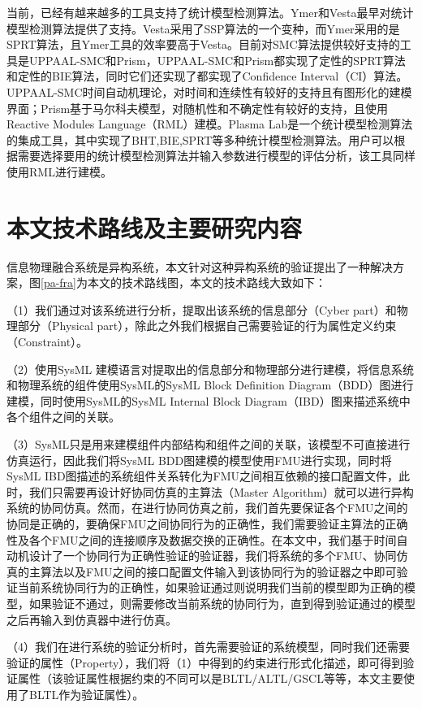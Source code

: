 当前，已经有越来越多的工具支持了统计模型检测算法。Ymer\cite{younes2005ymer}和Vesta\cite{sen2005vesta}最早对统计模型检测算法提供了支持。Vesta采用了SSP算法的一个变种，而Ymer采用的是SPRT算法，且Ymer工具的效率要高于Vesta。目前对SMC算法提供较好支持的工具是UPPAAL-SMC和Prism，UPPAAL-SMC和Prism都实现了定性的SPRT算法和定性的BIE算法，同时它们还实现了都实现了Confidence Interval（CI）\cite{brown2001interval}算法。UPPAAL-SMC时间自动机理论，对时间和连续性有较好的支持且有图形化的建模界面；Prism基于马尔科夫模型，对随机性和不确定性有较好的支持，且使用Reactive Modules Language（RML）建模。Plasma Lab\cite{boyer2013plasma}是一个统计模型检测算法的集成工具，其中实现了BHT,BIE,SPRT等多种统计模型检测算法。用户可以根据需要选择要用的统计模型检测算法并输入参数进行模型的评估分析，该工具同样使用RML进行建模。


\section{本文技术路线及主要研究内容}
信息物理融合系统是异构系统，本文针对这种异构系统的验证提出了一种解决方案，图\ref{pa-fra}为本文的技术路线图，本文的技术路线大致如下：

（1）我们通过对该系统进行分析，提取出该系统的信息部分（Cyber part）和物理部分（Physical part），除此之外我们根据自己需要验证的行为属性定义约束（Constraint）。

（2）使用SysML\cite{Dori16} 建模语言对提取出的信息部分和物理部分进行建模，将信息系统和物理系统的组件使用SysML的SysML Block Definition Diagram（BDD）图进行建模，同时使用SysML的SysML Internal Block Diagram（IBD）图来描述系统中各个组件之间的关联。

（3）SysML只是用来建模组件内部结构和组件之间的关联，该模型不可直接进行仿真运行，因此我们将SysML BDD图建模的模型使用FMU进行实现，同时将SysML IBD图描述的系统组件关系转化为FMU之间相互依赖的接口配置文件，此时，我们只需要再设计好协同仿真的主算法（Master Algorithm）就可以进行异构系统的协同仿真。然而，在进行协同仿真之前，我们首先要保证各个FMU之间的协同是正确的，要确保FMU之间协同行为的正确性，我们需要验证主算法的正确性及各个FMU之间的连接顺序及数据交换的正确性。在本文中，我们基于时间自动机设计了一个协同行为正确性验证的验证器，我们将系统的多个FMU、协同仿真的主算法以及FMU之间的接口配置文件输入到该协同行为的验证器之中即可验证当前系统协同行为的正确性，如果验证通过则说明我们当前的模型即为正确的模型，如果验证不通过，则需要修改当前系统的协同行为，直到得到验证通过的模型之后再输入到仿真器中进行仿真。

（4）我们在进行系统的验证分析时，首先需要验证的系统模型，同时我们还需要验证的属性（Property），我们将（1）中得到的约束进行形式化描述，即可得到验证属性（该验证属性根据约束的不同可以是BLTL/ALTL/GSCL等等，本文主要使用了BLTL作为验证属性）。

